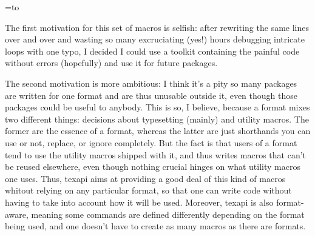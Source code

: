 \newblock\description
  {\getdescriptiontitle}
  {\relax}

\def\getdescriptiontitle#1{%
  \def\bookmarktitle{#1}%
  \def\descriptiontitle{}%
  \dofor{#1 }##1 {%
    \dofor{##1}####1{%
      \addright\descriptiontitle{\lowercase{####1}\hskip0pt plus 8pt minus 2pt}%
      }{}%
    \addright\descriptiontitle{\unskip\spacecs}%
    }{}%
  \addright\descriptiontitle{\unskip}%
  }
\def\texapi{%
  {\codefont texapi}%
  \antigobblespace
  }

\overfullrule=0pt




\setbox\codebox=\vbox to 

The first motivation for this set of macros is selfish:
after rewriting the same lines over and over and wasting
so many excruciating (yes!) hours debugging intricate loops
with one typo, I decided I could use a toolkit containing
the painful code without errors (hopefully) and use it
for future packages.

The second motivation is more ambitious: I think it's a pity
so many packages are written for one format and are thus
unusable outside it, even though those packages could be useful
to anybody. This is so, I believe, because a format mixes two
different things: decisions about typesetting (mainly) and utility macros.
The former are the essence of a format, whereas the latter are just
shorthands you can use or not, replace, or ignore completely.
But the fact is that users of a format tend to use the utility macros
shipped with it, and thus writes macros that can't be reused elsewhere,
even though nothing crucial hinges on what utility macros one uses.
Thus, \texapi aims at providing a good deal of this kind of macros
whitout relying on any particular format, so that one can write
code without having to take into account how it will be used.
Moreover, \texapi is also format-aware, meaning some commands
are defined differently depending on the format being used,
and one doesn't have to create as many macros as there are formats.

